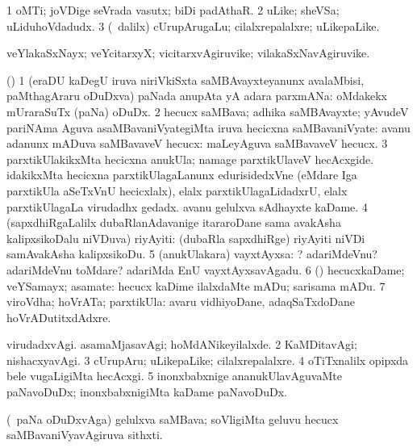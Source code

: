 \bentry
{}
\gl{\nA}
\bmng
\bnum
\num{1} oMTi; joVDige seVrada vasutx; biDi padAthaR. 
\num{2} uLike; sheVSa; uLiduhoVdadudx. 
\num{3} (\bava\ dalilx) cUrupArugaLu; cilalxrepalalxre; uLikepaLike. 
\enum
\emng
\eentry

\bentry
{}
\gl{\nA}
\bmng
veYlakaSxNayx; veYcitarxyX; vicitarxvAgiruvike; vilakaSxNavAgiruvike. 
\emng
\eentry

\bentry
{}
\gl{\nA}
\bmng
(\bava) 
\bnum
\num{1} (eraDU kaDegU iruva niriVkiSxta saMBAvayxteyanunx avalaMbisi, paMthagAraru oDuDxva) paNada anupAta yA adara parxmANa:  oMdakekx mUraraSuTx (paNa) oDuDx. 
\num{2} hecucx saMBava; adhika saMBAvayxte; yAvudeV pariNAma Aguva asaMBavaniVyategiMta iruva hecicxna saMBavaniVyate:  avanu adanunx mADuva saMBavaveV hecucx:  maLeyAguva saMBavaveV hecucx. 
\num{3} parxtikUlakikxMta hecicxna anukUla;  namage parxtikUlaveV hecAcxgide.  idakikxMta hecicxna parxtikUlagaLanunx edurisidedxVne (eMdare Iga parxtikUla aSeTxVnU hecicxlalx),  elalx parxtikUlagaLidadxrU, elalx parxtikUlagaLa virudadhx gedadx.  avanu gelulxva sAdhayxte kaDame. 
\num{4} (sapxdhiRgaLalilx dubaRlanAdavanige itararoDane sama avakAsha kalipxsikoDalu niVDuva) riyAyiti: (dubaRla sapxdhiRge) riyAyiti niVDi samAvakAsha kalipxsikoDu. 
\num{5} (anukUlakara) vayxtAyxsa: ? adariMdeVnu? adariMdeVnu toMdare?  adariMda EnU vayxtAyxsavAgadu. 
\num{6} (\pArxparx) hecucxkaDame; veYSamayx; asamate:  hecucx kaDime ilalxdaMte mADu; sarisama mADu. 
\num{7} viroVdha; hoVrATa; parxtikUla:  avaru vidhiyoDane, adaqSaTxdoDane hoVrADutitxdAdxre. 
\enum
\emng

\noindent
\gl{\pagu}
\bmng
\bnum
{}  
\banum
{} virudadxvAgi. 
 asamaMjasavAgi; hoMdANikeyilalxde. 
\eanum
\numie
\num{2}  KaMDitavAgi; nishacxyavAgi. 
\num{3}  cUrupAru; uLikepaLike; cilalxrepalalxre. 
\num{4}  oTiTxnalilx opipxda bele \mo vugaLigiMta hecAcxgi. 
\num{5}  inonxbabxnige ananukUlavAguvaMte paNavoDuDx; inonxbabxnigiMta kaDame paNavoDuDx. 
\enum
\emng
\eentry

\bentry
{}
\gl{\nA}
\bmng
(\kanmu\ paNa oDuDxvAga) gelulxva saMBava; soVligiMta geluvu hecucx saMBavaniVyavAgiruva sithxti. 
\emng
\eentry

